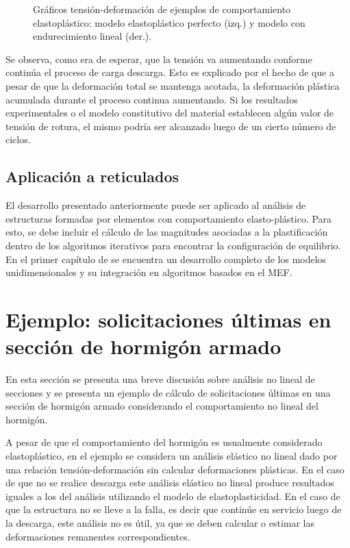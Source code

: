 \begin{figure}[htb]
	\centering
	\resizebox{.48\linewidth}{!}{}
	\resizebox{.48\linewidth}{!}{}
	\caption{Gráficos tensión-deformación de ejemplos de comportamiento elastoplástico: modelo elastoplástico perfecto (izq.) y modelo con endurecimiento lineal (der.).}
	\label{fig:grafsplast}
\end{figure}

Se observa, como era de esperar, que la tensión va aumentando conforme continúa el proceso de carga descarga. %
%
Esto es explicado por el hecho de que a pesar de que la deformación total se mantenga acotada, la deformación plástica acumulada durante el proceso continua aumentando. %
%
Si los resultados experimentales o el modelo constitutivo del material establecen algún valor de tensión de rotura, el mismo podría ser alcanzado luego de un cierto número de ciclos.

\subsection{Aplicación a reticulados}

El desarrollo presentado anteriormente puede ser aplicado al análisis de estructuras formadas por elementos con comportamiento elasto-plástico. %
%
Para esto, se debe incluir el cálculo de las magnitudes asociadas a la plastificación dentro de los algoritmos iterativos para encontrar la configuración de equilibrio. %
%
En el primer capítulo de \citep{Simo1998} se encuentra un desarrollo completo de los modelos unidimensionales y su integración en algoritmos basados en el MEF.

\section[Solicitaciones últimas en sección de hormigón armado] {Ejemplo: solicitaciones últimas en sección de hormigón armado} 
%

En esta sección se presenta una breve discusión sobre análisis no lineal de secciones y se presenta un ejemplo de cálculo de solicitaciones últimas en una sección de hormigón armado considerando el comportamiento no lineal del hormigón. %

A pesar de que el comportamiento del hormigón es usualmente considerado elastoplástico, en el ejemplo se considera un análisis elástico no lineal dado por una relación tensión-deformación sin calcular deformaciones plásticas. %
%
En el caso de que no se realice descarga este análisis elástico no lineal produce resultados iguales a los del análisis utilizando el modelo de elastoplasticidad. %
%
En el caso de que la estructura no se lleve a la falla, es decir que continúe en servicio luego de la descarga, este análisis no es útil, ya que se deben calcular o estimar las deformaciones remanentes correspondientes.

